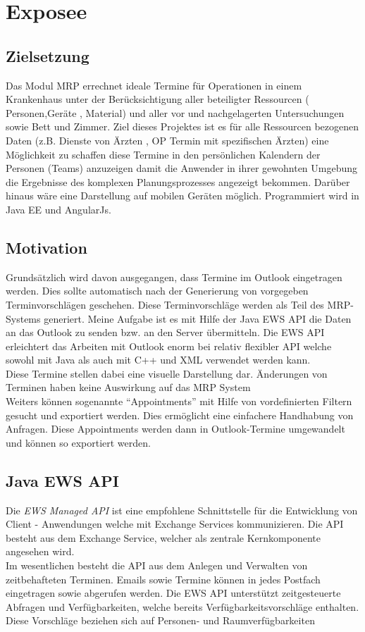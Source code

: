 \chapter{Exposee}

\section{Zielsetzung}
Das Modul MRP errechnet ideale Termine für Operationen in einem Krankenhaus unter der Berücksichtigung aller beteiligter Ressourcen ( Personen,Geräte , Material) und aller vor und nachgelagerten Untersuchungen sowie Bett und Zimmer. Ziel dieses Projektes ist es für alle Ressourcen bezogenen Daten (z.B. Dienste von Ärzten , OP Termin mit spezifischen Ärzten) eine Möglichkeit zu schaffen diese Termine in den persönlichen Kalendern der Personen (Teams) anzuzeigen damit die Anwender in ihrer gewohnten Umgebung die Ergebnisse des komplexen Planungsprozesses angezeigt bekommen. Darüber hinaus wäre eine Darstellung auf mobilen Geräten möglich. Programmiert wird in Java EE und AngularJs.
 

\section{Motivation}
Grundsätzlich wird davon ausgegangen, dass Termine im Outlook eingetragen werden. Dies sollte automatisch nach der Generierung von vorgegeben Terminvorschlägen geschehen. Diese Terminvorschläge werden als Teil des MRP-Systems generiert. Meine Aufgabe ist es mit Hilfe der Java EWS API die Daten an das Outlook zu senden bzw. an den Server übermitteln. Die EWS API erleichtert das Arbeiten mit Outlook enorm bei relativ flexibler API welche sowohl mit Java als auch mit C++ und XML verwendet werden kann.  \\

Diese Termine stellen dabei eine visuelle Darstellung dar. Änderungen von Terminen haben keine Auswirkung auf das MRP System  \\ 

Weiters können sogenannte "`Appointments"' mit Hilfe von vordefinierten Filtern gesucht und exportiert werden. Dies ermöglicht eine einfachere Handhabung von Anfragen. Diese Appointments werden dann in Outlook-Termine umgewandelt und können so exportiert werden. 


\section{Java EWS API}
Die \textit{ EWS Managed API} ist eine empfohlene Schnittstelle für die Entwicklung von Client - Anwendungen welche mit Exchange Services kommunizieren. Die API besteht aus dem Exchange Service, welcher als zentrale Kernkomponente angesehen wird.\\

Im wesentlichen besteht die API aus dem Anlegen und Verwalten von zeitbehafteten Terminen. Emails sowie Termine können in jedes Postfach eingetragen sowie abgerufen werden. Die EWS API unterstützt zeitgesteuerte Abfragen und Verfügbarkeiten, welche bereits Verfügbarkeitsvorschläge enthalten. Diese Vorschläge beziehen sich auf Personen- und Raumverfügbarkeiten 